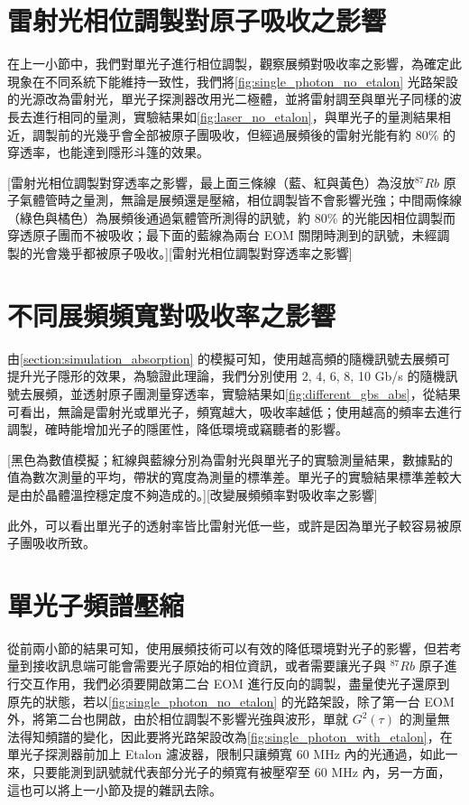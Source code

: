\documentclass[class=NCU_thesis, crop=false]{standalone}
\begin{document}
\section{雷射光相位調製對原子吸收之影響}
在上一小節中，我們對單光子進行相位調製，觀察展頻對吸收率之影響，為確定此現象在不同系統下能維持一致性，我們將\cref{fig:single_photon_no_etalon} 光路架設的光源改為雷射光，單光子探測器改用光二極體，並將雷射調至與單光子同樣的波長去進行相同的量測，實驗結果如\cref{fig:laser_no_etalon}，與單光子的量測結果相近，調製前的光幾乎會全部被原子團吸收，但經過展頻後的雷射光能有約 80\% 的穿透率，也能達到隱形斗篷的效果。

[雷射光相位調製對穿透率之影響，最上面三條線（藍、紅與黃色）為沒放$^{87}Rb$ 原子氣體管時之量測，無論是展頻還是壓縮，相位調製皆不會影響光強；中間兩條線（綠色與橘色）為展頻後通過氣體管所測得的訊號，約 80\% 的光能因相位調製而穿透原子團而不被吸收；最下面的藍線為兩台 EOM 關閉時測到的訊號，未經調製的光會幾乎都被原子吸收。][雷射光相位調製對穿透率之影響]

\section{不同展頻頻寬對吸收率之影響}
由\cref{section:simulation_absorption} 的模擬可知，使用越高頻的隨機訊號去展頻可提升光子隱形的效果，為驗證此理論，我們分別使用 2, 4, 6, 8, 10 Gb/s 的隨機訊號去展頻，並透射原子團測量穿透率，實驗結果如\cref{fig:different_gbs_abs}，從結果可看出，無論是雷射光或單光子，頻寬越大，吸收率越低；使用越高的頻率去進行調製，確時能增加光子的隱匿性，降低環境或竊聽者的影響。

[黑色為數值模擬；紅線與藍線分別為雷射光與單光子的實驗測量結果，數據點的值為數次測量的平均，帶狀的寬度為測量的標準差。單光子的實驗結果標準差較大是由於晶體溫控穩定度不夠造成的。][改變展頻頻率對吸收率之影響]

此外，可以看出單光子的透射率皆比雷射光低一些，或許是因為單光子較容易被原子團吸收所致。

\section{單光子頻譜壓縮}

從前兩小節的結果可知，使用展頻技術可以有效的降低環境對光子的影響，但若考量到接收訊息端可能會需要光子原始的相位資訊，或者需要讓光子與 $^{87}Rb$ 原子進行交互作用，我們必須要開啟第二台 EOM 進行反向的調製，盡量使光子還原到原先的狀態，若以\cref{fig:single_photon_no_etalon} 的光路架設，除了第一台 EOM 外，將第二台也開啟，由於相位調製不影響光強與波形，單就 $G^{2}(\tau)$ 的測量無法得知頻譜的變化，因此要將光路架設改為\cref{fig:single_photon_with_etalon}，在單光子探測器前加上 Etalon 濾波器，限制只讓頻寬 60 MHz 內的光通過，如此一來，只要能測到訊號就代表部分光子的頻寬有被壓窄至 60 MHz 內，另一方面，這也可以將上一小節及提的雜訊去除。
\end{document}
